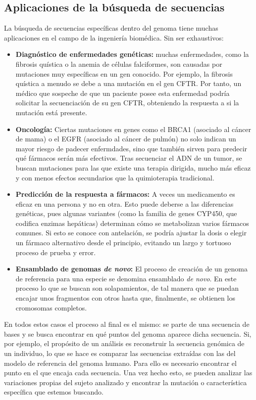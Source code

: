 \documentclass[10pt,a4paper,spanish]{article}
\begin{document}
\subsection{Aplicaciones de la búsqueda de secuencias}

La búsqueda de secuencias específicas dentro del genoma tiene muchas aplicaciones en el campo de la ingeniería biomédica. Sin ser exhaustivos:

\begin{itemize}
    \item \textbf{Diagnóstico de enfermedades genéticas:} muchas enfermedades, como la fibrosis quística o la anemia de células falciformes, son causadas por mutaciones muy específicas en un gen conocido. Por ejemplo, la fibrosis quística a menudo se debe a una mutación en el gen CFTR.
    Por tanto, un médico que sospeche de que un paciente posee esta enfermedad podría solicitar la secuenciación de su gen CFTR, obteniendo la respuesta a si la mutación está presente.
    \item \textbf{Oncología:} Ciertas mutaciones en genes como el BRCA1 (asociado al cáncer de mama) o el EGFR (asociado al cáncer de pulmón) no solo indican un mayor riesgo de padecer enfermdades, sino que también sirven para predecir qué fármacos serán más efectivos. Tras secuenciar el ADN de un tumor, se buscan mutaciones para las que existe una terapia dirigida, mucho más eficaz y con menos efectos secundarios que la quimioterapia tradicional.
    \item \textbf{Predicción de la respuesta a fármacos:} A veces un medicamento es eficaz en una persona y no en otra. Esto puede deberse a las diferencias genéticas, pues algunas variantes (como la familia de genes CYP450, que codifica enzimas hepáticas) determinan cómo se metabolizan varios fármacos comunes. Si esto se conoce con antelación, se podría ajustar la dosis o elegir un fármaco alternativo desde el principio, evitando un largo y tortuoso proceso de prueba y error.
    \item \textbf{Ensamblado de genomas \textit{de novo}:} El proceso de creación de un genoma de referencia para una especie se denomina ensamblado \textit{de novo}. En este proceso lo que se buscan son solapamientos, de tal manera que se puedan encajar unos fragmentos con otros hasta que, finalmente, se obtienen los cromosomas completos.
\end{itemize}

En todos estos casos el proceso al final es el mismo: se parte de una secuencia de bases y se busca encontrar en qué puntos del genoma aparece dicha secuencia. Si, por ejemplo, el propósito de un análisis es reconstruir la secuencia genómica de un individuo, lo que se hace es comparar las secuencias extraídas con las del modelo de referencia del genoma humano. Para ello es necesario encontrar el punto en el que encaja cada secuencia. Una vez hecho esto, se pueden analizar las variaciones propias del sujeto analizado y encontrar la mutación o característica específica que estemos buscando.
\end{document}

